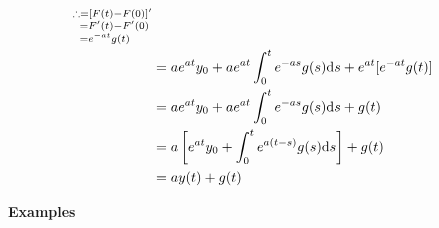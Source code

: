 \begin{enumerate}
\begin{explanation}
\begin{align*}
{\begin{subarray}{l}
                        \therefore =[F(t)-F(0)]^\prime \\
                        \enspace=F^\prime(t)-F^\prime(0) \\
                        \enspace=e^{-at}g(t)
                \end{subarray}} \\
                & =ae^{at}y_0+ae^{at}\int_0^t e^{-as}g(s)\mathrm{d}s+e^{at}[e^{-at}g(t)] \\
                & =ae^{at}y_0+ae^{at}\int_0^t e^{-as}g(s)\mathrm{d}s+g(t) \\
                & =a\left[e^{at}y_0+\int_0^t e^{a(t-s)}g(s)\mathrm{d}s\right]+g(t) \\
                & =ay(t)+g(t)
            \end{align*}
        \end{explanation}
\end{enumerate}

\textbf{Examples}


